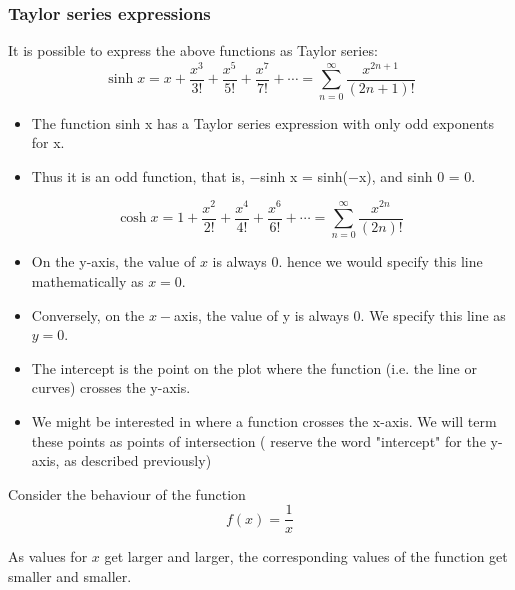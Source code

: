 
\begin{frame}
\frametitle{Taylor series expressions}
It is possible to express the above functions as Taylor series:
\[\sinh x = x + \frac {x^3} {3!} + \frac {x^5} {5!} + \frac {x^7} {7!} +\cdots = \sum_{n=0}^\infty \frac{x^{2n+1}}{(2n+1)!}\]

\end{frame}
\begin{frame}
\begin{itemize}
\item The function sinh x has a Taylor series expression with only odd exponents for x. 
\item 
Thus it is an odd function, that is, −sinh x = sinh(−x), and sinh 0 = 0.
\end{itemize}

\[\cosh x = 1 + \frac {x^2} {2!} + \frac {x^4} {4!} + \frac {x^6} {6!} + \cdots = \sum_{n=0}^\infty \frac{x^{2n}}{(2n)!}\]
\end{frame}

\begin{frame}
	\begin{itemize}
		
\item	On the y-axis, the value of $x$ is always 0. hence we would specify this line mathematically as $x=0$.
		
\item		Conversely, on the $x-$axis, the value of y is always 0. We specify this line as $y=0$.
		
\item		The intercept is the point on the plot where the function (i.e. the line or curves) crosses the y-axis.
		
\item		We might be interested in where a function crosses the x-axis. We will term these points as points of intersection ( reserve the word "intercept" for the y-axis, as described previously)
\end{itemize}	
\end{frame}
\begin{frame}
		
		Consider the behaviour of the function \[ f(x) = \frac{1}{x} \]
		
		As values for $x$ get larger and larger, the corresponding values of the function get smaller and smaller.
		
\end{frame}

